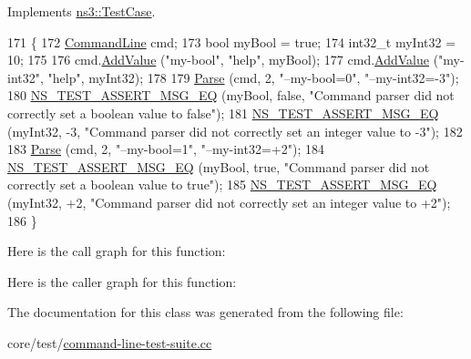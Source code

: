 Implements \hyperlink{classns3_1_1TestCase_a8ff74680cf017ed42011e4be51917a24}{ns3\+::\+Test\+Case}.


\begin{DoxyCode}
171 \{
172   \hyperlink{classns3_1_1CommandLine}{CommandLine} cmd;
173   \textcolor{keywordtype}{bool} myBool = \textcolor{keyword}{true};
174   int32\_t myInt32 = 10;
175 
176   cmd.\hyperlink{classns3_1_1CommandLine_addcfb546c7ad4c8bd0965654d55beb8e}{AddValue} (\textcolor{stringliteral}{"my-bool"}, \textcolor{stringliteral}{"help"}, myBool);
177   cmd.\hyperlink{classns3_1_1CommandLine_addcfb546c7ad4c8bd0965654d55beb8e}{AddValue} (\textcolor{stringliteral}{"my-int32"}, \textcolor{stringliteral}{"help"}, myInt32);
178 
179   \hyperlink{classCommandLineTestCaseBase_aa8bbc2d366637977fd21170282baaa0c}{Parse} (cmd, 2, \textcolor{stringliteral}{"--my-bool=0"}, \textcolor{stringliteral}{"--my-int32=-3"});
180   \hyperlink{group__testing_ga2a9d78cffb3db8e867c35fff0b698cf5}{NS\_TEST\_ASSERT\_MSG\_EQ} (myBool, \textcolor{keyword}{false}, \textcolor{stringliteral}{"Command parser did not correctly set a
       boolean value to false"});
181   \hyperlink{group__testing_ga2a9d78cffb3db8e867c35fff0b698cf5}{NS\_TEST\_ASSERT\_MSG\_EQ} (myInt32, -3, \textcolor{stringliteral}{"Command parser did not correctly set an integer
       value to -3"});
182 
183   \hyperlink{classCommandLineTestCaseBase_aa8bbc2d366637977fd21170282baaa0c}{Parse} (cmd, 2, \textcolor{stringliteral}{"--my-bool=1"}, \textcolor{stringliteral}{"--my-int32=+2"});
184   \hyperlink{group__testing_ga2a9d78cffb3db8e867c35fff0b698cf5}{NS\_TEST\_ASSERT\_MSG\_EQ} (myBool, \textcolor{keyword}{true}, \textcolor{stringliteral}{"Command parser did not correctly set a boolean
       value to true"});
185   \hyperlink{group__testing_ga2a9d78cffb3db8e867c35fff0b698cf5}{NS\_TEST\_ASSERT\_MSG\_EQ} (myInt32, +2, \textcolor{stringliteral}{"Command parser did not correctly set an integer
       value to +2"});
186 \}
\end{DoxyCode}


Here is the call graph for this function\+:




Here is the caller graph for this function\+:




The documentation for this class was generated from the following file\+:\begin{DoxyCompactItemize}
\item 
core/test/\hyperlink{command-line-test-suite_8cc}{command-\/line-\/test-\/suite.\+cc}\end{DoxyCompactItemize}
